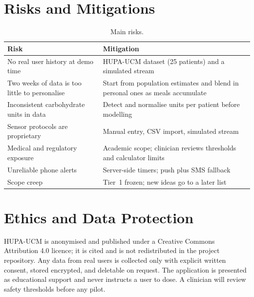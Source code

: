 \section{Risks and Mitigations}
\begin{table}[h]
\centering
\begin{tabularx}{\textwidth}{>{\raggedright\arraybackslash}p{}X}
\hline
Risk & Mitigation \\
\hline
No real user history at demo time & HUPA-UCM dataset (25 patients) and a simulated stream \\
Two weeks of data is too little to personalise & Start from population estimates and blend in personal ones as meals accumulate \\
Inconsistent carbohydrate units in data & Detect and normalise units per patient before modelling \\
Sensor protocols are proprietary & Manual entry, CSV import, simulated stream \\
Medical and regulatory exposure & Academic scope; clinician reviews thresholds and calculator limits \\
Unreliable phone alerts & Server-side timers; push plus SMS fallback \\
Scope creep & Tier~1 frozen; new ideas go to a later list \\
\hline
\end{tabularx}
\caption{Main risks.}
\end{table}

\section{Ethics and Data Protection}
HUPA-UCM is anonymised and published under a Creative Commons Attribution 4.0 licence; it is cited and is not redistributed in the project repository. Any data from real users is collected only with explicit written consent, stored encrypted, and deletable on request. The application is presented as educational support and never instructs a user to dose. A clinician will review safety thresholds before any pilot.

